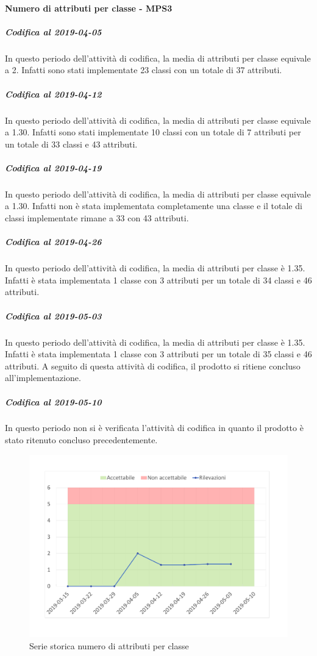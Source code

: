 \paragraph{Numero di attributi per classe - MPS3}
\subparagraph{Codifica al 2019-04-05}
In questo periodo dell'attività di codifica, la media di attributi per classe equivale a 2. Infatti sono stati implementate 23 classi con un totale di 37 attributi.

\subparagraph{Codifica al 2019-04-12}
In questo periodo dell'attività di codifica, la media di attributi per classe equivale a 1.30. Infatti sono stati implementate 10 classi con un totale di 7 attributi per un totale di 33 classi e 43 attributi.

\subparagraph{Codifica al 2019-04-19}
In questo periodo dell'attività di codifica, la media di attributi per classe equivale a 1.30. Infatti non è stata implementata completamente una classe e il totale di classi implementate rimane a 33 con 43 attributi.

\subparagraph{Codifica al 2019-04-26}
In questo periodo dell'attività di codifica, la media di attributi per classe è 1.35. Infatti è stata implementata 1 classe con 3 attributi per un totale di 34 classi e 46 attributi.

\subparagraph{Codifica al 2019-05-03}
In questo periodo dell'attività di codifica, la media di attributi per classe è 1.35. Infatti è stata implementata 1 classe con 3 attributi per un totale di 35 classi e 46 attributi.
A seguito di questa attività di codifica, il prodotto si ritiene concluso all'implementazione.

\subparagraph{Codifica al 2019-05-10}
In questo periodo non si è verificata l'attività di codifica in quanto il prodotto è stato ritenuto concluso precedentemente.

\begin{figure}[H]
	\centering
	\includegraphics[scale=0.6]{images/resoconto/MPS3Chart.pdf}
	\caption{Serie storica numero di attributi per classe}	
\end{figure}


